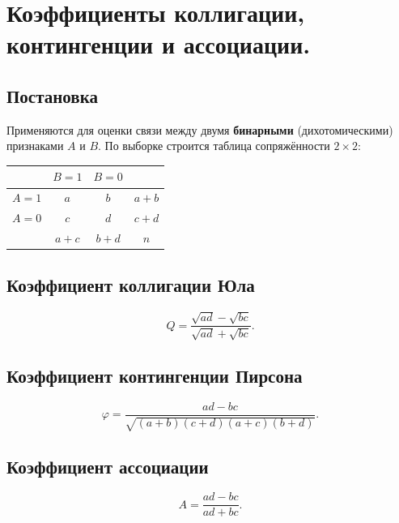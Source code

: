 \section{Коэффициенты коллигации, контингенции и ассоциации.}

\subsection*{Постановка}

Применяются для оценки связи между двумя \textbf{бинарными} (дихотомическими) признаками $A$ и $B$.
По выборке строится таблица сопряжённости $2\times 2$:

\begin{center}
\begin{tabular}{c|cc|c}
  \hline
  & $B=1$ & $B=0$ & \\
  \hline
  $A=1$ & $a$ & $b$ & $a+b$ \\
  $A=0$ & $c$ & $d$ & $c+d$ \\
  \hline
  & $a+c$ & $b+d$ & $n$ \\
  \hline
\end{tabular}
\end{center}

\subsection*{Коэффициент коллигации Юла}

\[
  Q = \frac{\sqrt{ad} - \sqrt{bc}}{\sqrt{ad} + \sqrt{bc}}.
\]

\subsection*{Коэффициент контингенции Пирсона}

\[
  \varphi = \frac{ad - bc}{\sqrt{(a+b)(c+d)(a+c)(b+d)}}.
\]

\subsection*{Коэффициент ассоциации}

\[
  A = \frac{ad - bc}{ad + bc}.
\]


